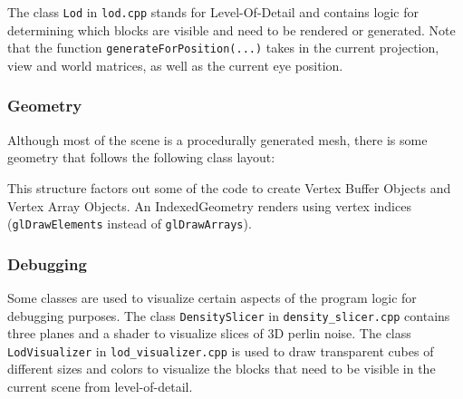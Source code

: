 \documentclass {article}
\begin{document}
The class \texttt{Lod} in \texttt{lod.cpp} stands for Level-Of-Detail and contains logic for determining which blocks are visible and need to be rendered or generated. Note that the function \texttt{generateForPosition(...)} takes in the current projection, view and world matrices, as well as the current eye position.

\subsubsection{Geometry}

Although most of the scene is a procedurally generated mesh, there is some geometry that follows the following class layout:

\vspace{5mm}

\begin{center}
\end{center}

\vspace{5mm}

This structure factors out some of the code to create Vertex Buffer Objects and Vertex Array Objects. An IndexedGeometry renders using vertex indices (\texttt{glDrawElements} instead of \texttt{glDrawArrays}).

\subsubsection{Debugging}

Some classes are used to visualize certain aspects of the program logic for debugging purposes. The class \texttt{DensitySlicer} in \texttt{density\_slicer.cpp} contains three planes and a shader to visualize slices of 3D perlin noise. The class \texttt{LodVisualizer} in \texttt{lod\_visualizer.cpp} is used to draw transparent cubes of different sizes and colors to visualize the blocks that need to be visible in the current scene from level-of-detail.
\end{document}
